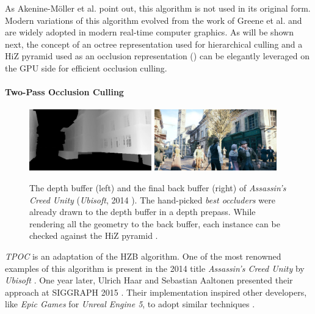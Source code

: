 \noindent 
As Akenine-Möller et al. \cite{AkenineMoeller2018} point out, this algorithm is not used in its original form. 
Modern variations of this algorithm evolved from the work of Greene et al. \cite{Greene93} and are widely adopted in 
modern real-time computer graphics. As will be shown next, the concept of an octree representation used for 
hierarchical culling and a \ac{HiZ} pyramid used as an occlusion representation (\cite{AkenineMoeller2018}) can be elegantly 
leveraged on the \ac{GPU} side for efficient occlusion culling.


\paragraph*{Two-Pass Occlusion Culling} \label{subsubsec-two-pass-occlusion-culling}

\begin{figure}[h]
    \centering
    \includegraphics[width=200px]{images/graphics/depth-buffer-ac-unity.jpg}
    \includegraphics[width=200px]{images/graphics/final-frame-ac-unity.jpg}
    \caption{The depth buffer (left) and the final back buffer (right) of \emph{Assassin's Creed Unity} (\emph{Ubisoft}, 2014 \cite{Ubisoft2014}). 
    The hand-picked \emph{best occluders} were already drawn to the depth buffer in a depth prepass.
    While rendering all the geometry to the back buffer, each instance can be checked against the \ac{HiZ} pyramid \cite{Kruskonja2022}.}
    \label{fig:depth-buffer-ac-unity}
\end{figure}

\noindent
\emph{\ac{TPOC}} is an adaptation of the \ac{HZB} algorithm. One of the most renowned examples of this algorithm is 
present in the 2014 title \emph{Assassin's Creed Unity} by \emph{Ubisoft} \cite{Ubisoft2014}. One year later, Ulrich 
Haar and Sebastian Aaltonen presented their approach at SIGGRAPH 2015 \cite{Aaltonen2015}. Their implementation 
inspired other developers, like \emph{Epic Games} for \emph{Unreal Engine 5}, to adopt similar techniques \cite{Karis2021}. \\
\enlargethispage{\baselineskip}
\enlargethispage{\baselineskip}

